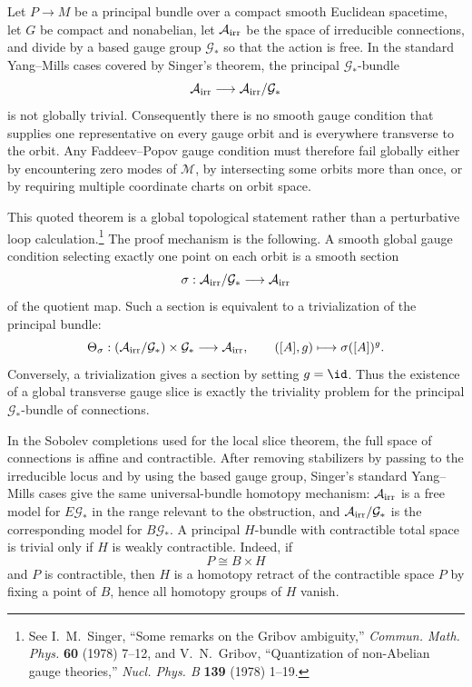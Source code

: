 \begin{quotedtheorem}
\label{thm:singer-gribov-obstruction}
Let \(P\to M\) be a principal bundle over a compact smooth Euclidean
spacetime, let \(G\) be compact and nonabelian, let
\(\mathcal A_{\rm irr}\) be the space of irreducible connections, and divide
by a based gauge group \(\mathcal G_\ast\) so that the action is free.  In the
standard Yang--Mills cases covered by Singer's theorem, the principal
\(\mathcal G_\ast\)-bundle
\[
  \mathcal A_{\rm irr}\longrightarrow
  \mathcal A_{\rm irr}/\mathcal G_\ast
\]
is not globally trivial.  Consequently there is no smooth gauge condition that
supplies one representative on every gauge orbit and is everywhere transverse
to the orbit.  Any Faddeev--Popov gauge condition must therefore fail globally
either by encountering zero modes of \(\mathcal M\), by intersecting some
orbits more than once, or by requiring multiple coordinate charts on orbit
space.
\end{quotedtheorem}

This quoted theorem is a global topological statement rather than a
perturbative loop calculation.\footnote{See I.~M.~Singer, ``Some remarks on
the Gribov ambiguity,'' \emph{Commun. Math. Phys.} \textbf{60} (1978) 7--12,
and V.~N.~Gribov, ``Quantization of non-Abelian gauge theories,''
\emph{Nucl. Phys. B} \textbf{139} (1978) 1--19.}  The proof mechanism is the
following.  A smooth global gauge condition selecting exactly one point on
each orbit is a smooth section
\[
  \sigma:\mathcal A_{\rm irr}/\mathcal G_\ast\longrightarrow \mathcal A_{\rm irr}
\]
of the quotient map.  Such a section is equivalent to a trivialization of the
principal bundle:
\begin{equation}
  \Theta_\sigma:
  (\mathcal A_{\rm irr}/\mathcal G_\ast)\times\mathcal G_\ast
  \longrightarrow
  \mathcal A_{\rm irr},
  \qquad
  ([A],g)\longmapsto \sigma([A])^g .
  \label{eq:singer-section-trivialization-map}
\end{equation}
Conversely, a trivialization gives a section by setting \(g=\id\).  Thus the
existence of a global transverse gauge slice is exactly the triviality problem
for the principal \(\mathcal G_\ast\)-bundle of connections.

In the Sobolev completions used for the local slice theorem, the full space of
connections is affine and contractible.  After removing stabilizers by passing
to the irreducible locus and by using the based gauge group, Singer's standard
Yang--Mills cases give the same universal-bundle homotopy mechanism:
\(\mathcal A_{\rm irr}\) is a free model for \(E\mathcal G_\ast\) in the
range relevant to the obstruction, and
\(\mathcal A_{\rm irr}/\mathcal G_\ast\) is the corresponding model for
\(B\mathcal G_\ast\).  A principal \(H\)-bundle with contractible total space
is trivial only if \(H\) is weakly contractible.  Indeed, if
\[
  P\cong B\times H
\]
and \(P\) is contractible, then \(H\) is a homotopy retract of the
contractible space \(P\) by fixing a point of \(B\), hence all homotopy groups
of \(H\) vanish.

